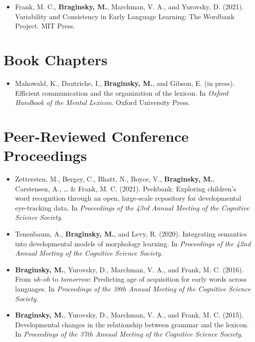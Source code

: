\documentclass[11pt,]{article}
\providecommand{\tightlist}{%
  \setlength{\itemsep}{0pt}\setlength{\parskip}{0pt}}
\begin{document}
\begin{itemize}
\tightlist
\item
  Frank, M. C., \textbf{Braginsky, M.}, Marchman, V. A., and Yurovsky,
  D. (2021). Variability and Consistency in Early Language Learning: The
  Wordbank Project. MIT Press.
\end{itemize}

\hypertarget{book-chapters}{%
\section{Book Chapters}\label{book-chapters}}

\begin{itemize}
\tightlist
\item
  Mahowald, K., Dautriche, I., \textbf{Braginsky, M.}, and Gibson, E.
  (in press). Efficient communication and the organization of the
  lexicon. In \emph{Oxford Handbook of the Mental Lexicon}. Oxford
  University Press.
\end{itemize}

\hypertarget{peer-reviewed-conference-proceedings}{%
\section{Peer-Reviewed Conference
Proceedings}\label{peer-reviewed-conference-proceedings}}

\begin{itemize}
\item
  Zettersten, M., Bergey, C., Bhatt, N., Boyce, V., \textbf{Braginsky,
  M.}, Carstensen, A., \ldots{} \& Frank, M. C. (2021). Peekbank:
  Exploring children's word recognition through an open, large-scale
  repository for developmental eye-tracking data. In \emph{Proceedings
  of the 43rd Annual Meeting of the Cognitive Science Society}.
\item
  Tenenbaum, A., \textbf{Braginsky, M.}, and Levy, R. (2020).
  Integrating semantics into developmental models of morphology
  learning. In \emph{Proceedings of the 42nd Annual Meeting of the
  Cognitive Science Society}.
\item
  \textbf{Braginsky, M.}, Yurovsky, D., Marchman, V. A., and Frank, M.
  C. (2016). From \emph{uh-oh} to \emph{tomorrow}: Predicting age of
  acquisition for early words across languages. In \emph{Proceedings of
  the 38th Annual Meeting of the Cognitive Science Society}.
\item
  \textbf{Braginsky, M.}, Yurovsky, D., Marchman, V. A., and Frank, M.
  C. (2015). Developmental changes in the relationship between grammar
  and the lexicon. In \emph{Proceedings of the 37th Annual Meeting of
  the Cognitive Science Society}.
\end{itemize}
\end{document}
